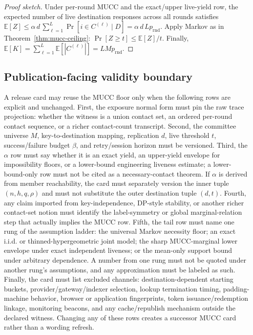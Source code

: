 \documentclass[11pt]{article}
\newcommand{\E}{\mathbb{E}}
\begin{document}
\begin{proof}[Proof sketch]
Under per-round MUCC and the exact/upper live-yield row, the expected number of live destination responses across all rounds satisfies
$\E[Z]\le\alpha\,d\,\sum_{\ell=1}^L \Pr[i\in C^{(\ell)}\mid D] = \alpha\,d\,L p_{\mathrm{rnd}}$.
Apply Markov as in Theorem~\ref{thm:mucc-ceiling}: $\Pr[Z\ge t]\le \E[Z]/t$.
Finally, $\E[K]=\sum_{\ell=1}^L \E[|C^{(\ell)}|]=L M p_{\mathrm{rnd}}$.
\end{proof}


\subsection{Publication-facing validity boundary}
A release card may reuse the MUCC floor only when the following rows are explicit and unchanged.
First, the exposure normal form must pin the raw trace projection: whether the witness is a union contact set, an ordered per-round contact sequence, or a richer contact-count transcript.
Second, the committee universe $M$, key-to-destination mapping, replication $d$, live threshold $t$, success/failure budget $\beta$, and retry/session horizon must be versioned.
Third, the $\alpha$ row must say whether it is an exact yield, an upper-yield envelope for impossibility floors, or a lower-bound engineering liveness estimate; a lower-bound-only row must not be cited as a necessary-contact theorem.  If $\alpha$ is derived from member reachability, the card must separately version the inner tuple $(n,h,q,\rho)$ and must not substitute the outer destination tuple $(d,t)$.
Fourth, any claim imported from key-independence, DP-style stability, or another richer contact-set notion must identify the label-symmetry or global marginal-relation step that actually implies the MUCC row.
Fifth, the tail row must name one rung of the assumption ladder: the universal Markov necessity floor; an exact i.i.d. or thinned-hypergeometric joint model; the sharp MUCC-marginal lower envelope under exact independent liveness; or the mean-only support bound under arbitrary dependence.  A number from one rung must not be quoted under another rung's assumptions, and any approximation must be labeled as such.
Finally, the card must list excluded channels: destination-dependent starting buckets, provider/gateway/indexer selection, lookup termination timing, padding-machine behavior, browser or application fingerprints, token issuance/redemption linkage, monitoring beacons, and any cache/republish mechanism outside the declared witness.
Changing any of these rows creates a successor MUCC card rather than a wording refresh.
\end{document}
